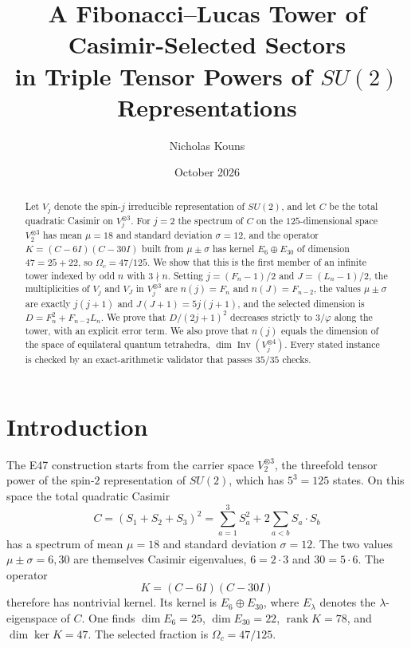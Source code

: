 \documentclass[11pt]{amsart}
\title[A Fibonacci--Lucas Tower of Casimir-Selected Sectors]{A Fibonacci--Lucas Tower of Casimir-Selected Sectors\\ in Triple Tensor Powers of $SU(2)$ Representations}
\author{Nicholas Kouns}
\date{October 2026}
\theoremstyle{definition}
\theoremstyle{remark}
\newcommand{\Inv}{\operatorname{Inv}}
\newcommand{\rank}{\operatorname{rank}}
\begin{document}
\begin{abstract}
Let $V_j$ denote the spin-$j$ irreducible representation of $SU(2)$, and let $C$ be the total quadratic Casimir on $V_j^{\otimes 3}$. For $j=2$ the spectrum of $C$ on the $125$-dimensional space $V_2^{\otimes 3}$ has mean $\mu=18$ and standard deviation $\sigma=12$, and the operator $K=(C-6I)(C-30I)$ built from $\mu\pm\sigma$ has kernel $E_6\oplus E_{30}$ of dimension $47=25+22$, so $\Omega_c=47/125$. We show that this is the first member of an infinite tower indexed by odd $n$ with $3\nmid n$. Setting $j=(F_n-1)/2$ and $J=(L_n-1)/2$, the multiplicities of $V_j$ and $V_J$ in $V_j^{\otimes 3}$ are $n(j)=F_n$ and $n(J)=F_{n-2}$, the values $\mu\pm\sigma$ are exactly $j(j+1)$ and $J(J+1)=5j(j+1)$, and the selected dimension is $D=F_n^2+F_{n-2}L_n$. We prove that $D/(2j+1)^2$ decreases strictly to $3/\varphi$ along the tower, with an explicit error term. We also prove that $n(j)$ equals the dimension of the space of equilateral quantum tetrahedra, $\dim\Inv(V_j^{\otimes 4})$. Every stated instance is checked by an exact-arithmetic validator that passes $35/35$ checks.
\end{abstract}
\maketitle

\section{Introduction}

The E47 construction starts from the carrier space $V_2^{\otimes 3}$, the threefold tensor power of the spin-$2$ representation of $SU(2)$, which has $5^3=125$ states. On this space the total quadratic Casimir
\[
C=(S_1+S_2+S_3)^2=\sum_{a=1}^{3}S_a^2+2\sum_{a<b}S_a\cdot S_b
\]
has a spectrum of mean $\mu=18$ and standard deviation $\sigma=12$. The two values $\mu\pm\sigma=6,30$ are themselves Casimir eigenvalues, $6=2\cdot 3$ and $30=5\cdot 6$. The operator
\[
K=(C-6I)(C-30I)
\]
therefore has nontrivial kernel. Its kernel is $E_6\oplus E_{30}$, where $E_\lambda$ denotes the $\lambda$-eigenspace of $C$. One finds $\dim E_6=25$, $\dim E_{30}=22$, $\rank K=78$, and $\dim\ker K=47$. The selected fraction is $\Omega_c=47/125$.
\end{document}
